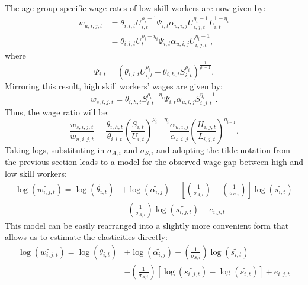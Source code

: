 \documentclass[]{article}
\begin{document}
The age group-specific wage rates of low-skill workers are now given
by:
\begin{align}
  w_{u,i,j,t}&= \theta_{i,l,t}U_{i,t}^{\rho_{i}-1}\Psi_{i,t} \alpha_{u,i,j}U_{i,j,t}^{\eta_{i}-1}L_{i,t}^{1-\eta_{i}} \\
             &=
               \theta_{i,l,t}U_{t}^{\rho_{i}-\eta_{i}}\Psi_{i,t}\alpha_{u,i,j}U_{i,j,t}^{\eta_{i}-1},   \label{eq:5}
\end{align}
where
\begin{equation}
  \label{eq:6}
  \Psi_{i,t}=\left( \theta_{i,l,t}U_{i,t}^{\rho_{i}}+\theta_{i,h,t}S_{i,t}^{\rho_{i}} \right)^{\frac{1}{\rho_{i}-1}}.
\end{equation}
Mirroring this result, high skill workers' wages are given by:
\begin{equation}
  \label{eq:7}
  w_{s,i,j,t}=\theta_{i,h,t}S_{i,t}^{\rho_{i}-\eta_{i}}\Psi_{i,t} \alpha_{u,i,j}S_{i,j,t}^{\eta_{i}-1}.
\end{equation}
Thus, the wage ratio will be:
\begin{equation}
  \label{eq:8}
  \frac{w_{s,i,j,t}}{w_{u,i,j,t}}=\frac{\theta_{i,h,t}}{\theta_{i,l,t}} \left( \frac{S_{i,t}}{U_{i,t}} \right)^{\rho_{i}-\eta_{i}}\frac{\alpha_{u,i,j}}{\alpha_{s,i,j}}\left( \frac{H_{i,j,t}}{L_{i,j,t}} \right)^{\eta_{i-1}}.
\end{equation}
Taking logs, substituting in $\sigma_{A,i}$ and $\sigma_{S,i}$ and
adopting the tilde-notation from the previous section leads to a model
for the observed wage gap between high and low skill workers:
\begin{align}
  \label{eq:9}
  \log \left( \widetilde{w_{i,j,t}} \right) = \log \left(
  \widetilde{\theta_{i,t}} \right) &+ \log \left(
                                     \widetilde{\alpha_{i,j}} \right) + \left[ \left(
                                     \frac{1}{\sigma_{A,i}} \right)-\left( \frac{1}{\sigma_{S,i}}
                                     \right) \right] \log \left(\widetilde{s_{i,t}} \right)
                                     \nonumber \\ &-
                                                    \left( \frac{1}{\sigma_{A,i}} \right)\log \left(
                                                    \widetilde{s_{i,j,t}} \right) + e_{i,j,t}
\end{align}
This model can be easily rearranged into a slightly more convenient
form that allows us to estimate the elasticities directly:
\begin{align}
  \label{eq:10}
  \log \left( \widetilde{w_{i,j,t}} \right) = \log \left(
  \widetilde{\theta_{i,t}} \right) &+ \log \left(
                                     \widetilde{\alpha_{i,j}} \right) +  \left(
                                     \frac{1}{\sigma_{S,i}} \right) \log \left(\widetilde{s_{i,t}} \right)
                                     \nonumber \\ &-
                                                    \left( \frac{1}{\sigma_{A,i}} \right) \left[ \log \left(\widetilde{s_{i,j,t}} \right)- \log \left( \widetilde{s_{i,t}} \right) \right] + e_{i,j,t}
\end{align}
\end{document}
